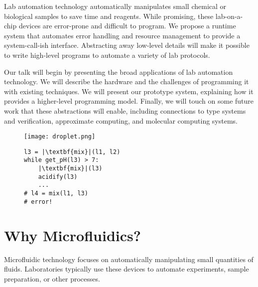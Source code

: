 \documentclass[
  10pt,
  a4paper,
  twocolumn,
]{article}
\title{\mytitle}
\author{\myauthors
\\ \small Paul G. Allen School for Computer Science and Engineering
\\ \small University of Washington}
\date{}
\begin{document}
\maketitle

Lab automation technology automatically manipulates small chemical or biological samples to save time and reagents.
While promising, these lab-on-a-chip devices are error-prone and difficult to program.
We propose a runtime system that automates error handling and resource management to provide a system-call-ish interface.
Abstracting away low-level details will make it possible to write high-level programs to automate a variety of lab protocols.

Our talk will begin by presenting the broad applications of lab automation technology.
We will describe the hardware and the challenges of programming it with existing techniques.
We will present our prototype system, explaining how it provides a higher-level programming model.
Finally, we will touch on some future work that these abstractions will enable, including connections to type systems and verification, approximate computing, and molecular computing systems.

\begin{figure}[h]
  \begin{minipage}{0.4\linewidth}
    \footnotesize
    \centering
    \texttt{[image: droplet.png]}
  \end{minipage}
  \hfill
  \begin{minipage}{0.53\linewidth}
    \begin{verbatim}
l3 = |\textbf{mix}|(l1, l2)
while get_pH(l3) > 7:
    |\textbf{mix}|(l3)
    acidify(l3)
    ...
# l4 = mix(l1, l3)
# error!
    \end{verbatim}
  \end{minipage}
  \label{fig:board}
  \vspace{-1em}
  \label{fig:code}
  \vspace{-2em}
\end{figure}

\section*{Why Microfluidics?}

Microfluidic technology focuses on automatically manipulating small quantities of fluids.
Laboratories typically use these devices to automate experiments, sample preparation, or other processes.
\end{document}
